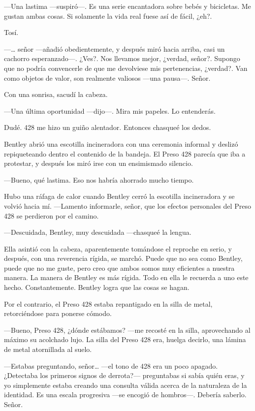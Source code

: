 ---Una lastima ---suspiró---. Es una serie encantadora sobre bebés y
bicicletas. Me gustan ambas cosas. Si solamente la vida real fuese así
de fácil, ¿eh?.

Tosí.

---\ldots{} señor ---añadió obedientemente, y después miró hacia arriba,
casi un cachorro esperanzado---. ¿Ves?. Nos llevamos mejor, ¿verdad,
señor?. Supongo que no podría convencerle de que me devolviese mis
pertenencias, ¿verdad?. Van como objetos de valor, son realmente
valiosos ---una pausa---. Señor.

Con una sonrisa, sacudí la cabeza.

---Una última oportunidad ---dijo---. Mira mis papeles. Lo entenderás.

Dudé. 428 me hizo un guiño alentador. Entonces chasqueé los dedos.

Bentley abrió una escotilla incineradora con una ceremonia informal y
deslizó repiqueteando dentro el contenido de la bandeja. El Preso 428
parecía que iba a protestar, y después los miró irse con un ensimismado
silencio.

---Bueno, qué lastima. Eso nos habría ahorrado mucho tiempo.

Hubo una ráfaga de calor cuando Bentley cerró la escotilla incineradora
y se volvió hacia mí. ---Lamento informarle, señor, que los efectos
personales del Preso 428 se perdieron por el camino.

---Descuidada, Bentley, muy descuidada ---chasqueé la lengua.

Ella asintió con la cabeza, aparentemente tomándose el reproche en
serio, y después, con una reverencia rígida, se marchó. Puede que no sea
como Bentley, puede que no me guste, pero creo que ambos somos muy
eficientes a nuestra manera. La manera de Bentley es más rígida. Todo en
ella le recuerda a uno este hecho. Constantemente. Bentley logra que las
cosas se hagan.

Por el contrario, el Preso 428 estaba repantigado en la silla de metal,
retorciéndose para ponerse cómodo.

---Bueno, Preso 428, ¿dónde estábamos? ---me recosté en la silla,
aprovechando al máximo su acolchado lujo. La silla del Preso 428 era,
huelga decirlo, una lámina de metal atornillada al suelo.

---Estabas preguntando, señor\ldots{} ---el tono de 428 era un poco
apagado. ¿Detectaba los primeros signos de derrota?--- preguntabas si
sabía quién eras, y yo simplemente estaba creando una consulta válida
acerca de la naturaleza de la identidad. Es una escala progresiva ---se
encogió de hombros---. Debería saberlo. Señor.

